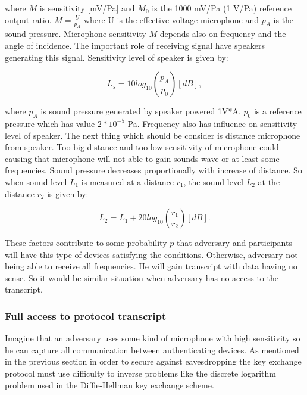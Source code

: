 \documentclass[11pt,titlepage]{article}
\theoremstyle{plain}
\begin{document}
where $M$ is sensitivity [mV/Pa] and $M_0$ is the 1000 mV/Pa (1 V/Pa) reference output ratio. $M = \frac{U}{p_A}$ where U is the effective voltage microphone and $p_A$ is the sound pressure. Microphone sensitivity $M$ depends also on frequency and the angle of incidence. The important role of receiving signal have speakers generating this signal. Sensitivity level of speaker is given by: 

\begin{equation}
	L_s = 10 log_{10}\left(\frac{p_A}{p_0}\right)[dB],
\end{equation}

where $p_A$ is sound pressure generated by speaker powered 1V*A, $p_0$ is a reference pressure which has value $2*10^{-5}$ Pa. Frequency also has influence on sensitivity level of speaker. The next thing which should be consider is distance microphone from speaker. Too big distance and too low sensitivity of microphone could causing that microphone will not able to gain sounds wave or at least some frequencies. Sound pressure decreases proportionally with increase of distance. So when sound level $L_{1}$ is measured at a distance $r_1$, the sound level $L_2$ at the distance $r_2$ is given by:

\begin{equation}
	L_2 = L_1 + 20 log_{10} \left(\frac{r_1}{r_2}\right)[dB].
\end{equation}

These factors contribute to some probability $\bar{p}$ that adversary and participants will have this type of devices satisfying the conditions. Otherwise, adversary not being able to receive all frequencies. He will gain transcript with data having no sense. So it would be similar situation when adversary has no access to the transcript.  


\subsubsection{Full access to protocol transcript}
Imagine that an adversary uses some kind of microphone with high sensitivity so he can capture all communication between authenticating devices. As mentioned in the previous section in order to secure against eavesdropping the key exchange protocol must use difficulty to inverse problems like the discrete logarithm problem used in the Diffie-Hellman key exchange scheme.
\end{document}

